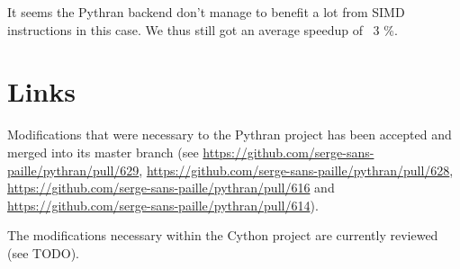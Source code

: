 \documentclass{deliverablereport}
\begin{document}
It seems the Pythran backend don't manage to benefit a lot from SIMD
instructions in this case. We thus still got an average speedup of ~3 \%.

\section{Links}
\label{sec:links}

Modifications that were necessary to the Pythran project has been accepted and
merged into its master branch (see
\url{https://github.com/serge-sans-paille/pythran/pull/629},
\url{https://github.com/serge-sans-paille/pythran/pull/628},
\url{https://github.com/serge-sans-paille/pythran/pull/616} and
\url{https://github.com/serge-sans-paille/pythran/pull/614}).

The modifications necessary within the Cython project are currently reviewed
(see TODO).

\printbibliography
\end{document}
